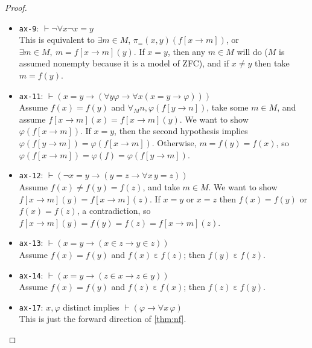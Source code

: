 \documentclass[runningheads,a4paper]{llncs}
\newcommand{\vph}{\varphi}
\newcommand{\ep}{\mathbin{\varepsilon}}
\begin{document}
\begin{proof}
\begin{itemize}
  \item \texttt{ax-9}: $\vdash\lnot\forall x\lnot x=y$\\
  This is equivalent to $\exists m\in M$, $\pi_=(x,y)(f[x\to m])$, or $\exists m\in M,\ m=f[x\to m](y)$. If $x=y$, then any $m\in M$ will do ($M$ is assumed nonempty because it is a model of \textsf{ZFC}), and if $x\ne y$ then take $m=f(y)$.
  \item \texttt{ax-11}: $\vdash(x=y\to(\forall y\vph\to\forall x(x=y\to\vph)))$\\
  Assume $f(x)=f(y)$ and $\forall_M n, \vph(f[y\to n])$, take some $m\in M$, and assume $f[x\to m](x)=f[x\to m](y)$. We want to show $\vph(f[x\to m])$. If $x=y$, then the second hypothesis implies $\vph(f[y\to m])=\vph(f[x\to m])$. Otherwise, $m=f(y)=f(x)$, so $\vph(f[x\to m])=\vph(f)=\vph(f[y\to m])$.
  \item \texttt{ax-12}: $\vdash(\lnot x=y\to(y=z\to\forall x\,y=z))$\\
  Assume $f(x)\ne f(y)=f(z)$, and take $m\in M$. We want to show $f[x\to m](y)=f[x\to m](z)$. If $x=y$ or $x=z$ then $f(x)=f(y)$ or $f(x)=f(z)$, a contradiction, so $f[x\to m](y)=f(y)=f(z)=f[x\to m](z)$.
  \item \texttt{ax-13}: $\vdash(x=y\to(x\in z\to y\in z))$\\
  Assume $f(x)=f(y)$ and $f(x)\ep f(z)$; then $f(y)\ep f(z)$.
  \item \texttt{ax-14}: $\vdash(x=y\to(z\in x\to z\in y))$\\
  Assume $f(x)=f(y)$ and $f(z)\ep f(x)$; then $f(z)\ep f(y)$.
  \item \texttt{ax-17}: $x,\vph$ distinct implies $\vdash(\vph\to\forall x\,\vph)$\\
  This is just the forward direction of \autoref{thm:nf}.
\end{itemize}


\end{proof}
\end{document}
